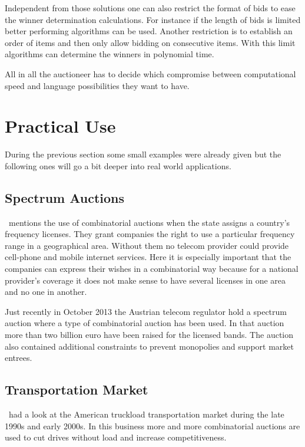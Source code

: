 \documentclass[a4paper]{paper}
\begin{document}
Independent from those solutions one can also restrict the format of bids to ease the winner determination calculations. For instance if the length of bids is limited better performing algorithms can be used. Another restriction is to establish an order of items and then only allow bidding on consecutive items. With this limit algorithms can determine the winners in polynomial time.

All in all the auctioneer has to decide which compromise between computational speed and language possibilities they want to have.

\section{Practical Use}

During the previous section some small examples were already given but the following ones will go a bit deeper into real world applications.

\subsection{Spectrum Auctions}
\cite[p.~269]{BN07}~mentions the use of combinatorial auctions when the state assigns a country's frequency licenses. They grant companies the right to use a particular frequency range in a geographical area. Without them no telecom provider could provide cell-phone and mobile internet services. Here it is especially important that the companies can express their wishes in a combinatorial way because for a national provider's coverage it does not make sense to have several licenses in one area and no one in another.

Just recently in October 2013 the Austrian telecom regulator hold a spectrum auction where a type of combinatorial auction has been used. In that auction more than two billion euro have been raised for the licensed bands. The auction also contained additional constraints to prevent monopolies and support market entrees.~\cite{RTR:Telecom}

\subsection{Transportation Market}
\cite{CELM07}~had a look at the American truckload transportation market during the late 1990s and early 2000s. In this business more and more combinatorial auctions are used to cut drives without load and increase competitiveness.
\end{document}
